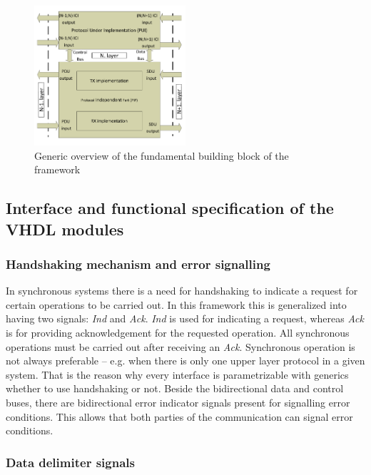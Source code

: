 \documentclass[conference]{IEEEtran}
\begin{document}
\begin{figure}[!htb]
    \centering
    \includegraphics[width=0.5\textwidth]{figures_raw/system_sketch.pdf}
    \caption{Generic overview of the fundamental building block of the framework}
    \label{fig:system_sketch}
\end{figure}

\subsection{Interface and functional specification of the VHDL modules}\label{subsec:if_and_func_spec_VHDL}

\subsubsection{Handshaking mechanism and error signalling}
In synchronous systems there is a need for handshaking to indicate a request for certain operations to be carried out.
In this framework this is generalized into having two signals: \emph{Ind} and \emph{Ack}.
\emph{Ind} is used for indicating a request, whereas \emph{Ack} is for providing acknowledgement for
the requested operation. All synchronous operations must be carried out after receiving an \emph{Ack}.
Synchronous operation is not always preferable -- e.g. when there is only one upper layer protocol in a
given system. That is the reason why every interface is parametrizable with generics whether to use
handshaking or not.
Beside the bidirectional data and control buses, there are bidirectional error indicator signals present
for signalling error conditions. This allows that both parties of the communication can signal error conditions.

\subsubsection{Data delimiter signals}
\end{document}
